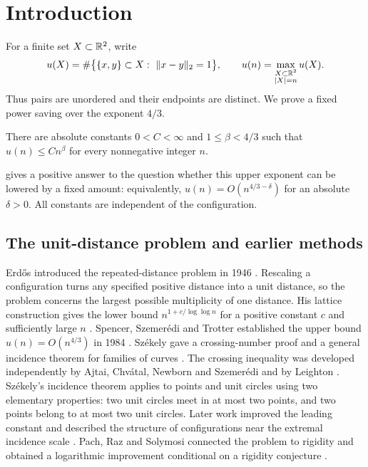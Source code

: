\section{Introduction}\label{sec:introduction}

For a finite set \(X\subset\mathbb R^2\), write
\[
 u(X)=\#\bigl\{\{x,y\}\subset X:\ \norm{x-y}_2=1\bigr\},
 \qquad
 u(n)=\max_{\substack{X\subset\R^2\\ |X|=n}}u(X).
\]
Thus pairs are unordered and their endpoints are distinct. We prove a fixed
power saving over the exponent \(4/3\).

\begin{theorem}\label{thm:main}
There are absolute constants \(0<C<\infty\) and \(1\le\beta<4/3\) such that
\(u(n)\le Cn^\beta\) for every nonnegative integer \(n\).
\end{theorem}

 gives a positive answer to the question whether this upper
exponent can be lowered by a fixed amount: equivalently,
\(u(n)=O(n^{4/3-\delta})\) for an absolute \(\delta>0\).
All constants are independent of the configuration.

\subsection{The unit-distance problem and earlier methods}

Erd\H{o}s introduced the repeated-distance problem in 1946
\cite{erdos1946}. Rescaling a configuration turns any specified positive
distance into a unit distance, so the problem concerns the largest possible
multiplicity of one distance. His lattice construction gives the lower bound
\(n^{1+c/\log\log n}\) for a positive constant \(c\) and sufficiently large
\(n\) \cite[Theorem~2]{erdos1946}.
Spencer, Szemer\'edi and Trotter established the upper bound
\(u(n)=O(n^{4/3})\) in 1984 \cite{sst1984}.
Sz\'ekely gave a crossing-number proof and a general incidence theorem
for families of curves \cite[Theorems~4 and~8]{Szekely1997}.
The crossing inequality was developed independently by Ajtai,
Chv\'atal, Newborn and Szemer\'edi and by Leighton
\cite{ajtaiEtAl1982,leighton1983}.
Sz\'ekely's incidence theorem applies to points and unit circles using two elementary
properties: two unit circles meet in at most two points, and two points
belong to at most two unit circles.
Later work improved the leading constant
\cite{agostonPalvolgyi2022} and described the structure of configurations
near the extremal incidence scale \cite{katzSilier2026}.
Pach, Raz and Solymosi connected the problem to rigidity and obtained
a logarithmic improvement conditional on a rigidity conjecture
\cite[Conjecture~7 and Theorem~8]{pachRazSolymosi2026}.

